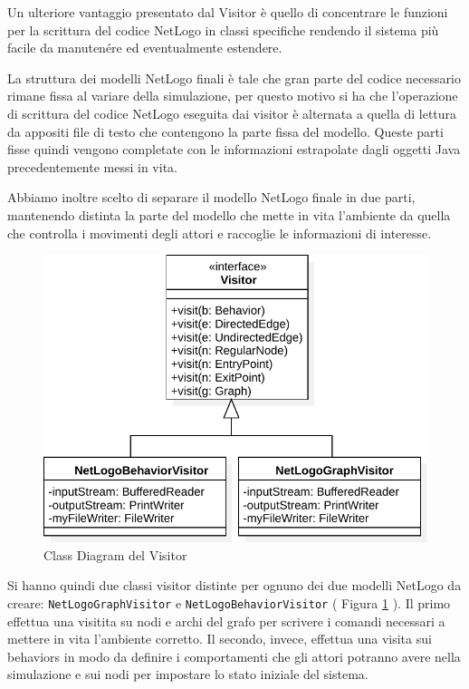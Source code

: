 Un ulteriore vantaggio presentato dal Visitor è quello di concentrare le funzioni per la scrittura del codice NetLogo in classi specifiche rendendo il sistema più facile da manutenére ed eventualmente estendere.

La struttura dei modelli NetLogo finali è tale che gran parte del codice necessario rimane fissa al variare della simulazione, per questo motivo si ha che l'operazione di scrittura del codice NetLogo eseguita dai visitor è alternata a quella di lettura da appositi file di testo che contengono la parte fissa del modello. Queste parti fisse quindi vengono completate con le informazioni estrapolate dagli oggetti Java precedentemente messi in vita.

Abbiamo inoltre scelto di separare il modello NetLogo finale in due parti, mantenendo distinta la parte del modello che mette in vita l'ambiente da quella che controlla i movimenti degli attori e raccoglie le informazioni di interesse.

\begin{figure}[htb]
\centering
\includegraphics[width=\textwidth,height=\textheight,keepaspectratio]{images/visitor-class-diagram.pdf}
\caption{Class Diagram del Visitor}
\label{fig:visitor-diagram}
\end{figure}
Si hanno quindi due classi visitor distinte per ognuno dei due modelli NetLogo da creare: \texttt{NetLogoGraphVisitor} e \texttt{NetLogoBehaviorVisitor} ( Figura \ref{fig:visitor-diagram} ). Il primo effettua una visitita su nodi e archi del grafo per scrivere i comandi necessari a mettere in vita l'ambiente corretto. Il secondo, invece, effettua una visita sui behaviors in modo da definire i comportamenti che gli attori potranno avere nella simulazione e sui nodi per impostare lo stato iniziale del sistema.

